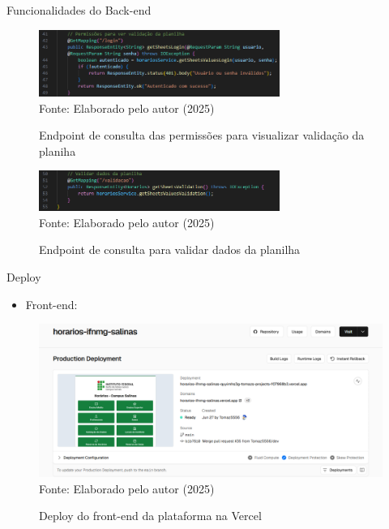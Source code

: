 \begin{frame}{Funcionalidades do Back-end}
    \begin{figure}
        \centering
        \vspace{-0.3cm}
        \caption{Endpoint de consulta das permissões para visualizar validação da planiha}
        \vspace{-0.2cm}
        \includegraphics[width=0.7\textwidth]{figuras/back-7.png}
        \\ %
        \small Fonte: Elaborado pelo autor (2025)
    \end{figure}
    \begin{figure}
        \centering
        \vspace{-0.5cm}
        \caption{Endpoint de consulta para validar dados da planilha}
        \vspace{-0.2cm}
        \includegraphics[width=0.7\textwidth]{figuras/back-8.png}
        \\ %
        \small Fonte: Elaborado pelo autor (2025)
    \end{figure}
\end{frame}

\begin{frame}{Deploy}
    \begin{itemize}
        \item Front-end:
    \end{itemize}
    \begin{figure}
        \centering
        \vspace{-0.3cm}
        \caption{Deploy do front-end da plataforma na Vercel}
        \vspace{-0.2cm}
        \includegraphics[width=1\textwidth]{figuras/deploy-1.png}
        \\ %
        \small Fonte: Elaborado pelo autor (2025)
    \end{figure}
\end{frame}

